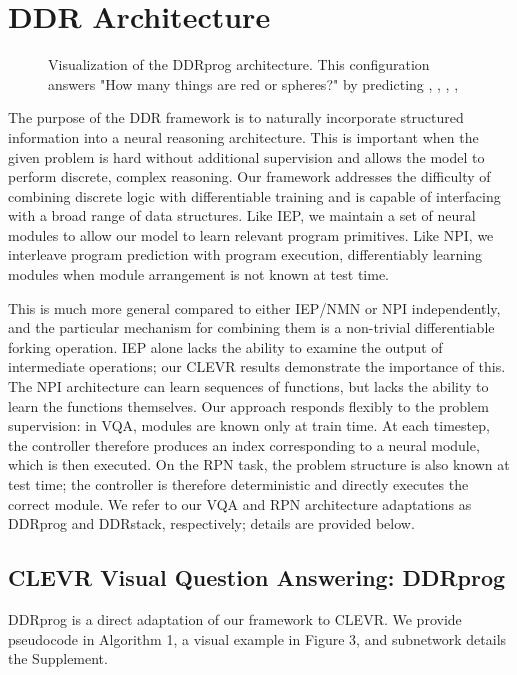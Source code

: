 \documentclass{article}
\begin{document}
\section{DDR Architecture}
\begin{figure*}
  \centering
  \vspace{-4mm}
  \caption{Visualization of the DDRprog architecture. This configuration answers "How many things are red or spheres?" by predicting , , , , }
  \vspace{-2mm}
\end{figure*}
The purpose of the DDR framework is to naturally incorporate structured information into a neural reasoning architecture. This is important when the given problem is hard without additional supervision and allows the model to perform discrete, complex reasoning. Our framework addresses the difficulty of combining discrete logic with differentiable training and is capable of interfacing with a broad range of data structures. Like IEP, we maintain a set of neural modules to allow our model to learn relevant program primitives. Like NPI, we interleave program prediction with program execution, differentiably learning modules when module arrangement is not known at test time.

This is much more general compared to either IEP/NMN or NPI independently, and the particular mechanism for combining them is a non-trivial differentiable forking operation. IEP alone lacks the ability to examine the output of intermediate operations; our CLEVR results demonstrate the importance of this. The NPI architecture can learn sequences of functions, but lacks the ability to learn the functions themselves. Our approach responds flexibly to the problem supervision: in VQA, modules are known only at train time. At each timestep, the controller therefore produces an index corresponding to a neural module, which is then executed. On the RPN task, the problem structure is also known at test time; the controller is therefore deterministic and directly executes the correct module. We refer to our VQA and RPN architecture adaptations as DDRprog and DDRstack, respectively; details are provided below.

\subsection{CLEVR Visual Question Answering: DDRprog}
DDRprog is a direct adaptation of our framework to CLEVR. We provide pseudocode in Algorithm 1, a visual example in Figure 3, and subnetwork details the Supplement.
\end{document}
